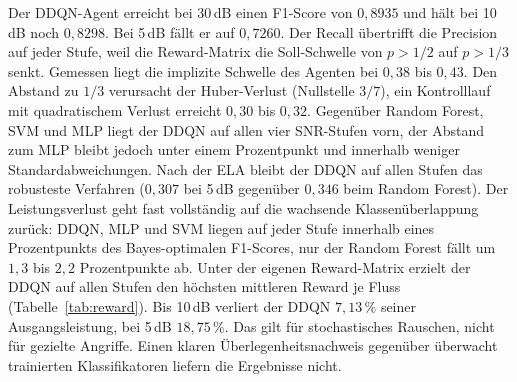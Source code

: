 Der DDQN-Agent erreicht bei 30\,dB einen F1-Score von $0{,}8935$ und hält bei 10\,dB noch $0{,}8298$. Bei 5\,dB fällt er auf $0{,}7260$. Der Recall übertrifft die Precision auf jeder Stufe, weil die Reward-Matrix die Soll-Schwelle von $p>1/2$ auf $p>1/3$ senkt. Gemessen liegt die implizite Schwelle des Agenten bei $0{,}38$ bis $0{,}43$. Den Abstand zu $1/3$ verursacht der Huber-Verlust (Nullstelle $3/7$), ein Kontrolllauf mit quadratischem Verlust erreicht $0{,}30$ bis $0{,}32$. Gegenüber Random Forest, SVM und MLP liegt der DDQN auf allen vier SNR-Stufen vorn, der Abstand zum MLP bleibt jedoch unter einem Prozentpunkt und innerhalb weniger Standardabweichungen. Nach der ELA bleibt der DDQN auf allen Stufen das robusteste Verfahren ($0{,}307$ bei 5\,dB gegenüber $0{,}346$ beim Random Forest). Der Leistungsverlust geht fast vollständig auf die wachsende Klassenüberlappung zurück: DDQN, MLP und SVM liegen auf jeder Stufe innerhalb eines Prozentpunkts des Bayes-optimalen F1-Scores, nur der Random Forest fällt um $1{,}3$ bis $2{,}2$ Prozentpunkte ab. Unter der eigenen Reward-Matrix erzielt der DDQN auf allen Stufen den höchsten mittleren Reward je Fluss (Tabelle~\ref{tab:reward}). Bis 10\,dB verliert der DDQN $7{,}13\,\%$ seiner Ausgangsleistung, bei 5\,dB $18{,}75\,\%$. Das gilt für stochastisches Rauschen, nicht für gezielte Angriffe. Einen klaren Überlegenheitsnachweis gegenüber überwacht trainierten Klassifikatoren liefern die Ergebnisse nicht.

